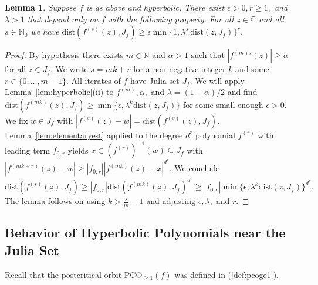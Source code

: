 \documentclass[12pt,oneside,a4]{amsart}
\newcommand{\IC}{\mathbb{C}}
\newcommand{\IN}{\mathbb{N}}
\newcounter{maincounter}
\numberwithin{maincounter}{section}
\numberwithin{equation}{section}
\newtheorem{lemma}[maincounter]{Lemma}
\renewcommand{\subset}{\subseteq}
\newcommand{\pco}{\mathrm{PCO}}
\begin{document}
\begin{lemma}
  \label{lem:hyperbolic2}
  Suppose $f$ is as above and hyperbolic.  
  There exist $\epsilon>0,r\ge 1,$ and $\lambda>1$ that depend
  only on $f$ with the following property. For all $z\in\IC$ and all
  $s\in\IN_0$ we have $\mathrm{dist}(f^{(s)}(z),J_f) \ge \epsilon
  \min\{1,\lambda^s\, \mathrm{dist}(z,J_f)\}^r$.
\end{lemma}
\begin{proof}
  By hypothesis  there exists $m\in\IN$ and $\alpha>1$ such that
  $|{f^{(m)}}'(z)|\ge
  \alpha$ for all $z\in J_f$.
  We write 
  $s=mk+r$ for a non-negative integer $k$
  and some $r\in \{0,\ldots,m-1\}$.
  All iterates of $f$ have  Julia set $J_f$.
  We will apply Lemma~\ref{lem:hyperbolic}(ii) to
  $f^{(m)},\alpha,$ and $\lambda=(1+\alpha)/2$ and find
  $\mathrm{dist}(f^{(mk)}(z),J_f) \ge
  \min\{\epsilon,\lambda^{k}\mathrm{dist}(z,J_f)\}$ for some small
  enough $\epsilon>0$.
  We fix $w\in J_f$ with $|f^{(s)}(z)-w| =
  \mathrm{dist}(f^{(s)}(z),J_f)$. 
  Lemma~\ref{lem:elementaryest}  applied to the degree $d^r$
  polynomial
  $f^{(r)}$ with leading term $f_{0,r}$  yields
  $x\in (f^{(r)})^{-1}(w)\subset J_f$ with 
  $
  |f^{(mk+r)}(z)-w|
  \ge
  |f_{0,r}| |f^{(mk)}(z)-x|^{d^r}$.  We conclude
  $$
  \mathrm{dist}(f^{(s)}(z),J_f)
  \ge |f_{0,r}|\mathrm{dist}(f^{(mk)}(z),J_f)^{d^r}
  \ge |f_{0,r}|\min\{\epsilon,\lambda^{k}
  \mathrm{dist}(z,J_f)\}^{d^r}.$$ 
  The lemma follows on using $k>\frac sm -1$ and adjusting
  $\epsilon, \lambda,$ and $r$.
\end{proof}




\subsection{Behavior of Hyperbolic Polynomials near the Julia Set}


\newcommand{\varz}{w}
\newcommand{\varw}{z}
Recall that the postcritical orbit
$\pco_{\ge 1}(f)$
was defined in (\ref{def:pcoge1}).
\end{document}
